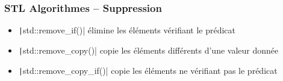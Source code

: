 \documentclass[C++.tex]{subfiles}
\begin{document}
\begin{frame}[fragile]
	\frametitle{STL Algorithmes -- Suppression}
	\begin{itemize}
		\item \texttt|std::remove_if()| élimine les éléments vérifiant le prédicat
		\item \texttt|std::remove_copy()| copie les éléments différents d'une valeur donnée
		\item \texttt|std::remove_copy_if()| copie les éléments ne vérifiant pas le prédicat
	\end{itemize}

	\begin{codesample}
		\sample{https://godbolt.org/#g:!((g:!((g:!((h:codeEditor,i:(filename:'1',fontScale:14,fontUsePx:'0',j:1,lang:c%
}
\end{codesample}
\end{frame}
\end{document}
